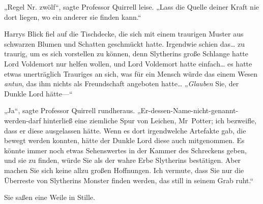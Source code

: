 „Regel Nr. zwölf“, sagte Professor Quirrell leise. „Lass die Quelle deiner Kraft nie dort liegen, wo ein anderer sie finden kann.“

Harrys Blick fiel auf die Tischdecke, die sich mit einem traurigen Muster aus schwarzen Blumen und Schatten geschmückt hatte. Irgendwie schien das… zu traurig, um es sich vorstellen zu können, denn Slytherins große Schlange hatte Lord Voldemort nur helfen wollen, und Lord Voldemort hatte einfach… es hatte etwas unerträglich Trauriges an sich, was für ein Mensch würde das einem Wesen \emph{antun}, das ihm nichts als Freundschaft angeboten hatte… „\emph{Glauben} Sie, der Dunkle Lord hätte—“

„Ja“, sagte Professor Quirrell rundheraus. „Er-dessen-Name-nicht-genannt-werden-darf hinterließ eine ziemliche Spur von Leichen, Mr~Potter; ich bezweifle, dass er diese ausgelassen hätte. Wenn es dort irgendwelche Artefakte gab, die bewegt werden konnten, hätte der Dunkle Lord diese auch mitgenommen. Es könnte immer noch etwas Sehenswertes in der Kammer des Schreckens geben, und sie zu finden, würde Sie als der wahre Erbe Slytherins bestätigen. Aber machen Sie sich keine allzu großen Hoffnungen. Ich vermute, dass Sie nur die Überreste von Slytherins Monster finden werden, das still in seinem Grab ruht.“

Sie saßen eine Weile in Stille.

